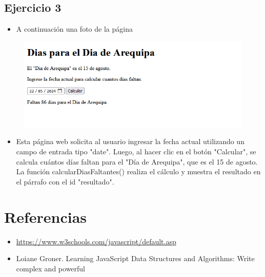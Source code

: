 \documentclass{article}
\begin{document}
	\subsection{Ejercicio 3}
		
	\begin{itemize}
			\item A continuación una foto de la página
		\end{itemize} 
		\begin{figure}[H]
			\centering
			\includegraphics[width=1.0\textwidth,keepaspectratio]{img/ejercicio3.PNG}
		\end{figure}
		\begin{itemize}
			\item Esta página web solicita al usuario ingresar la fecha actual utilizando un campo de entrada tipo "date". Luego, al hacer clic en el botón "Calcular", se calcula cuántos días faltan para el "Día de Arequipa", que es el 15 de agosto. La función calcularDiasFaltantes() realiza el cálculo y muestra el resultado en el párrafo con el id "resultado".
		\end{itemize} 
\section{Referencias}
\begin{itemize}			
	\item \url{https://www.w3schools.com/javascript/default.asp}
	\item	Loiane Groner. Learning JavaScript Data Structures and Algorithms: Write complex and powerful
\end{itemize}	
	
%
%
%
			
\end{document}

